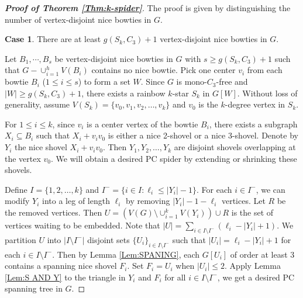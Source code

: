 \documentclass[11pt,a4paper]{article}
\theoremstyle{definition}
\newtheorem{case}{Case}
\begin{document}
\setcounter{case}{0}
\begin{proof}[\textbf{Proof of Theorem \ref{Thm:k-spider}}]
The proof is given by distinguishing the number of vertex-disjoint nice bowties in $G$.
\begin{case}
    There are at least $g(S_k,C_3)+1$ vertex-disjoint nice bowties in $G$.
\end{case}
Let $B_1,\cdots,B_s$ be vertex-disjoint nice bowties in $G$ with $s\geq g(S_k,C_3)+1$ such that $G-\cup^h_{i=1} {V(B_i)}$  contains no nice bowtie.   Pick one center $v_i$ from each bowtie $B_i$ ($1\leq i\leq s$) to form a set  $W$.  Since $G$ is mono-$C_3$-free and $|W|\geq g(S_k,C_3)+1$, there exists a rainbow $k$-star $S_k$ in $G[W]$. Without loss of generality, assume $V(S_k)=\{v_0, v_1,v_2, \ldots, v_k\}$ and $v_0$ is the $k$-degree vertex in $S_k$.

For $1\leq i\leq k$, since $v_i$ is a center vertex of the bowtie $B_i$, there exists a subgraph $X_i\subseteq B_i$ such that $X_i+v_iv_0$ is either a nice 2-shovel or a nice 3-shovel. Denote by $Y_i$  the nice shovel $X_i+v_iv_0$. Then $Y_1,Y_2,\ldots,Y_k$ are disjoint shovels overlapping at the vertex $v_0$. We will obtain a desired PC spider by extending or shrinking these shovels.

Define $I=\{1,2,\ldots,k\}$ and $I^-=\{i\in I:  \ell_i \leq |Y_i|-1\}$.
For each $i\in I^-$,  we can modify $Y_i$ into a leg of length $\ell_i$ by removing  $|Y_i|-1-\ell_i $ vertices.  Let $R$  be the removed vertices. Then $U=(V(G)\setminus \cup^k_{i=1} V(Y_i))\cup R$ is the set of vertices waiting to be embedded. Note that $|U|=\sum_{i\in I\setminus I^-} {(\ell_i-|Y_i|+1)}$. We partition $U$ into $|I\setminus I^-|$ disjoint sets $\{U_i\}_{i\in I\setminus I^-}$  such that $|U_i|=\ell_i-|Y_i|+1$ for each $i\in I\setminus I^-$.
Then by Lemma \ref{Lem:SPANING}, each $G[U_i]$ of order at least $3$ contains a spanning nice shovel $F_i$. Set $F_i=U_i$ when $|U_i|\leq 2$. Apply Lemma \ref{Lem:S AND Y} to the triangle in $Y_i$ and $F_i$ for all $i\in I\setminus I^-$, we get a desired PC spanning tree in $G$.


\end{proof}
\end{document}

